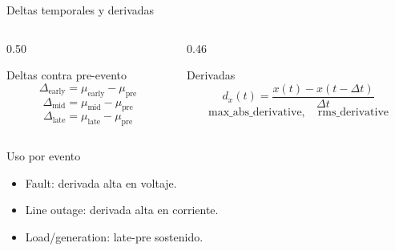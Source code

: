 \documentclass[10pt,aspectratio=169]{beamer}
\begin{document}
\begin{frame}{Deltas temporales y derivadas}
\small
\begin{columns}[T,totalwidth=\textwidth]
\begin{column}{0.50\textwidth}
\begin{block}{Deltas contra pre-evento}
\[
\Delta_{\mathrm{early}} = \mu_{\mathrm{early}} - \mu_{\mathrm{pre}}
\]
\[
\Delta_{\mathrm{mid}} = \mu_{\mathrm{mid}} - \mu_{\mathrm{pre}}
\]
\[
\Delta_{\mathrm{late}} = \mu_{\mathrm{late}} - \mu_{\mathrm{pre}}
\]
\end{block}
\end{column}
\begin{column}{0.46\textwidth}
\begin{block}{Derivadas}
\[
d_x(t) = \frac{x(t)-x(t-\Delta t)}{\Delta t}
\]
\[
\mathrm{max\_abs\_derivative},\quad \mathrm{rms\_derivative}
\]
\end{block}
\end{column}
\end{columns}
\vspace{2mm}
\begin{exampleblock}{Uso por evento}
\begin{itemize}
  \item Fault: derivada alta en voltaje.
  \item Line outage: derivada alta en corriente.
  \item Load/generation: late-pre sostenido.
\end{itemize}
\end{exampleblock}
\end{frame}
\end{document}
